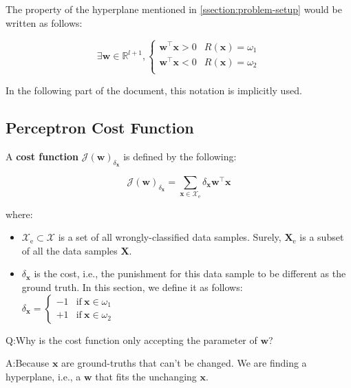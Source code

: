 \documentclass{article}
\begin{document}
The property of the hyperplane  mentioned in 
\ref{ssection:problem-setup} would be written as follows:

\begin{equation}
    \exists \mathbf{w} \in \mathbb{R}^{l+1}, 
    \begin{cases}
        \mathbf{w}^\top \mathbf{x} > 0 & R(\mathbf{x}) = \omega_{1} \\
        \mathbf{w}^\top \mathbf{x} < 0 & R(\mathbf{x}) = \omega_{2} \\
    \end{cases}
\end{equation}

In the following part of the document, this notation is implicitly used.

\clearpage

\subsection{Perceptron Cost Function}
A \textbf{cost function} $\mathcal{J}(\mathbf{w})_{\delta_{\mathbf{x}}}$ is defined by the following:

\begin{equation}
    {\mathcal{J}(\mathbf{w})}_{\delta_{\mathbf{x}}} = 
        \sum_{\mathbf{x}\in\mathcal{X}_{\text{e}}}
        \delta_{\mathbf{x}}
        \mathbf{w}^\top \mathbf{x}
\end{equation}

where:

\begin{itemize}
    \item $\mathcal{X}_{\text{e}} \subset \mathcal{X}$ is a set of all wrongly-classified data samples. Surely, $\mathbf{X}_{\text{e}}$ is a subset of all the data samples $\mathbf{X}$.
    \item $\delta_{\mathbf{x}}$ is the cost, i.e., the punishment for this data sample to be different as the ground truth. In this section, we define it as follows: \\ $\delta_{\mathbf{x}}=\begin{cases}-1 & \text{if} \ \mathbf{x}\in\omega_1 \\ +1 & \text{if} \ \mathbf{x}\in\omega_2\end{cases}$
\end{itemize}

Q:\@ Why is the cost function only accepting the parameter of $\mathbf{w}$? 

A:\@ Because $\mathbf{x}$ are ground-truths that can't be changed. We are finding a hyperplane, i.e., a $\mathbf{w}$ that fits the unchanging  $\mathbf{x}$.
\end{document}
